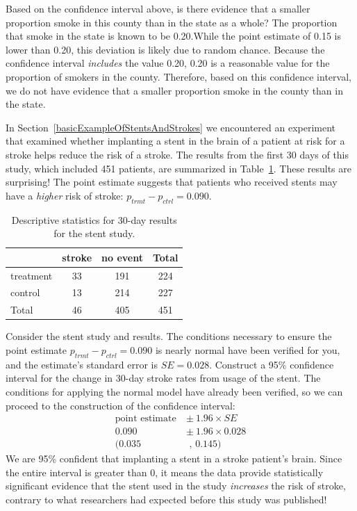 \begin{example}{Based on the confidence interval above, is there evidence that a smaller proportion smoke in this county than in the state as a whole? The proportion that smoke in the state is known to be 0.20.}While the point estimate of 0.15 is lower than 0.20, this deviation is likely due to random chance. Because the confidence interval \emph{includes} the value 0.20, 0.20 is a reasonable value for the proportion of smokers in the county. Therefore, based on this confidence interval, we do not have evidence that a smaller proportion smoke in the county than in the state.
\end{example}

In Section~\ref{basicExampleOfStentsAndStrokes} we encountered an experiment that examined whether implanting a stent in the brain of a patient at risk for a stroke helps reduce the risk of a stroke. The results from the first 30 days of this study, which included 451 patients, are summarized in Table~\ref{stentStudyResultsCIsection}. These results are surprising! The point estimate suggests that patients who received stents may have a \emph{higher} risk of stroke: $p_{trmt} - p_{ctrl} = 0.090$.

\begin{table}[h]
\centering
\begin{tabular}{l cc c}
  \hline
	& 	stroke 	& no event & Total \\
  \hline
treatment 	& 33		& 191	& 224 \\
control 	& 13		& 214	& 227 \\
  \hline
Total		& 46		& 405	& 451 \\
  \hline
\end{tabular}
\caption{Descriptive statistics for 30-day results for the stent study.}
\label{stentStudyResultsCIsection}
\end{table}

\begin{example}{Consider the stent study and results. The conditions necessary to ensure the point estimate $p_{trmt} - p_{ctrl} = 0.090$ is nearly normal have been verified for you, and the estimate's standard error is $SE = 0.028$. Construct a 95\% confidence interval for the change in 30-day stroke rates from usage of the stent.}
\label{stentStroke95CI_CIsection}
The conditions for applying the normal model have already been verified, so we can proceed to the construction of the confidence interval:
\begin{align*}
\text{point estimate}\ &\pm \ 1.96\times SE \\
0.090\ &\pm \ 1.96 \times 0.028 \\
(0.035&\text{ , } 0.145)
\end{align*}
We are 95\% confident that implanting a stent in a stroke patient's brain. Since the entire interval is greater than 0, it means the data provide statistically significant evidence that the stent used in the study \emph{increases} the risk of stroke, contrary to what researchers had expected before this study was published!
\end{example}

